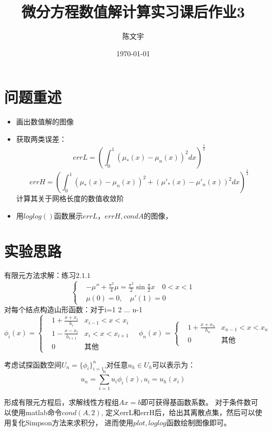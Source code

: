\documentclass{article}
\title{微分方程数值解计算实习课后作业3}
\author{陈文宇}
\date{\today}
\begin{document}
\maketitle

\tableofcontents

\newpage
\section{问题重述}

\begin{itemize}
    \item 画出数值解的图像
    \item 获取两类误差：
    $$ errL=(\int^{1}_{0}(\mu_{*}(x)-\mu_{n}(x))^{2}dx)^{\frac{1}{2}}$$
    $$ errH=(\int^{1}_{0}(\mu_{*}(x)-\mu_{n}(x))^{2}+(\mu'_{*}(x)-\mu'_{n}(x))^{2}dx)^{\frac{1}{2}}$$
    计算其关于网格长度的数值收敛阶
    \item 用$loglog()$函数展示$errL，errH,condA$的图像，
\end{itemize}
 
\section{实验思路}
有限元方法求解：练习$2.1.1$
\[
\left\{
\begin{aligned}
	&-\mu '' + \frac{\pi^{2}}{4}\mu = \frac{\pi^{2}}{2}\sin{\frac{\pi}{2}x} \quad0<x<1 
	\\
	&\mu(0)=0 ,\quad \mu'(1)=0 
\end{aligned}
\right.
\]
对每个结点构造山形函数：对于i=1 2 ... n-1
\[
\phi_{i}(x)=
\left\{
\begin{aligned}
	&1+\frac{x+x_{i}}{h_{i}}   &x_{i-1}<x<x_{i}
	\\
	&1-\frac{x-x_{i}}{h_{i+1}} & x_{i}<x<x_{i+1}
        \\
        &  0 & \text{其他}
\end{aligned}
\right.
\quad
\phi_{n}(x)=
\left\{
\begin{aligned}
	&1+\frac{x+x_{n}}{h_{n}}   &x_{n-1}<x<x_{n}
	\\
        &  0 & \text{其他}
\end{aligned}
\right.
\]

考虑试探函数空间$U_{n}=\{\phi_{i}\}_{i=1}^{n}$,对任意$u_{h}\in U_{h}$可以表示为：
$$u_{n}=\sum_{i=1}^{n}u_{i}\phi _{i}(x),u_{i}=u_{h}(x_{i})$$

形成有限元方程后，求解线性方程组$Ax=b$即可获得基函数系数。
对于条件数可以使用matlab命令$cond(A,2)$,
定义errL和errH后，给出其离散点集，然后可以使用复化Simpson方法来求积分，
进而使用$plot,loglog$函数绘制图像即可。
\end{document}
